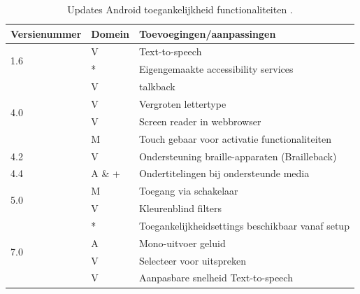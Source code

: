  \begin{table}[h]
       \centering
      \caption{Updates Android toegankelijkheid functionaliteiten \autocite{AndroidReleases}.}
    \label{androidUpdates}

    \begin{tabular}{|l|l|l|} 
        \hline
        \textbf{Versienummer} & \textbf{Domein} & \textbf{Toevoegingen/aanpassingen}                \\ 
        \hline
        \multirow{2}{*}{1.6}  & V               & \gls{Text-to-speech}                            \\ 
        \cline{2-3}
        & *               & Eigengemaakte accessibility services               \\ 
        \hline
        \multirow{4}{*}{4.0}  & V               & \gls{talkback}~                                         \\ 
        \cline{2-3}
        & V               & Vergroten lettertype                              \\ 
        \cline{2-3}
        & V               & Screen reader in webbrowser                        \\ 
        \cline{2-3}
        & M               & Touch gebaar voor activatie functionaliteiten     \\ 
        \hline
        4.2                   & V               & Ondersteuning braille-apparaten (Brailleback)     \\ 
        \hline
        4.4                   & A \& +          & Ondertitelingen bij ondersteunde media            \\ 
        \hline
        \multirow{2}{*}{5.0}  & M               & Toegang via schakelaar           \\ 
        \cline{2-3}
        & V               & Kleurenblind filters                              \\ 
         \cline{2-3}
        \hline
        \multirow{5}{*}{7.0}  & *               & Toegankelijkheidsettings beschikbaar vanaf setup  \\ 
        \cline{2-3}
        & A               & Mono-uitvoer geluid                               \\ 
         \cline{2-3}
        & V               & Selecteer voor uitspreken                            \\ 
        \cline{2-3}
        & V               & Aanpasbare snelheid \gls{Text-to-speech}                            \\ 

\end{tabular}
\end{table}
